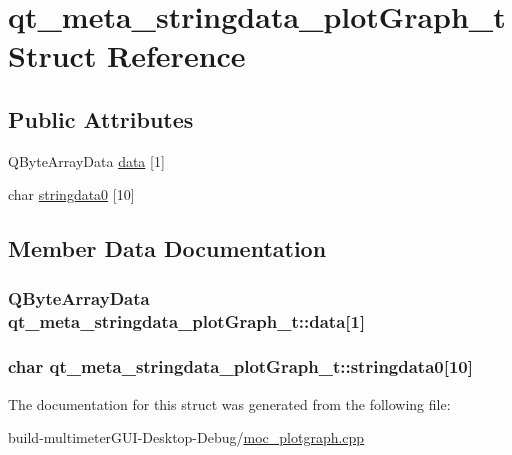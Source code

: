 \hypertarget{structqt__meta__stringdata__plot_graph__t}{\section{qt\-\_\-meta\-\_\-stringdata\-\_\-plot\-Graph\-\_\-t Struct Reference}
\label{structqt__meta__stringdata__plot_graph__t}
}
\subsection*{Public Attributes}
\begin{DoxyCompactItemize}
\item 
Q\-Byte\-Array\-Data \hyperlink{structqt__meta__stringdata__plot_graph__t_a8462d777cd33ffce77968c86f54a5f8f}{data} \mbox{[}1\mbox{]}
\item 
char \hyperlink{structqt__meta__stringdata__plot_graph__t_af67fc1530c903d84fd1d1b84a297f153}{stringdata0} \mbox{[}10\mbox{]}
\end{DoxyCompactItemize}


\subsection{Member Data Documentation}
\hypertarget{structqt__meta__stringdata__plot_graph__t_a8462d777cd33ffce77968c86f54a5f8f}{
\subsubsection[{data}]{\setlength{\rightskip}{0pt plus 5cm}Q\-Byte\-Array\-Data qt\-\_\-meta\-\_\-stringdata\-\_\-plot\-Graph\-\_\-t\-::data\mbox{[}1\mbox{]}}}\label{structqt__meta__stringdata__plot_graph__t_a8462d777cd33ffce77968c86f54a5f8f}
\hypertarget{structqt__meta__stringdata__plot_graph__t_af67fc1530c903d84fd1d1b84a297f153}{
\subsubsection[{stringdata0}]{\setlength{\rightskip}{0pt plus 5cm}char qt\-\_\-meta\-\_\-stringdata\-\_\-plot\-Graph\-\_\-t\-::stringdata0\mbox{[}10\mbox{]}}}\label{structqt__meta__stringdata__plot_graph__t_af67fc1530c903d84fd1d1b84a297f153}


The documentation for this struct was generated from the following file\-:\begin{DoxyCompactItemize}
\item 
build-\/multimeter\-G\-U\-I-\/\-Desktop-\/\-Debug/\hyperlink{moc__plotgraph_8cpp}{moc\-\_\-plotgraph.\-cpp}\end{DoxyCompactItemize}

